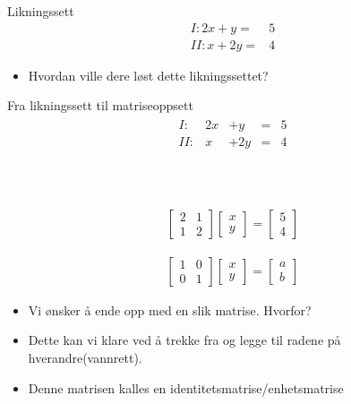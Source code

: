 \documentclass[norsk]{beamer}
\newcommand\Fontvi{\fontsize{20}{7.2}\selectfont}
\newcommand\Fontvitwo{\fontsize{10}{7.2}\selectfont}
\begin{document}
\Fontvi
\begin{frame}{Likningssett}
\begin{align*}
I: 2x + y =& 5\\
II: x + 2y =& 4
\end{align*}

\Fontvitwo
\begin{itemize}
	\item Hvordan ville dere løst dette likningssettet?
\end{itemize}
\end{frame}
\begin{frame}{Fra likningssett til matriseoppsett}
\Fontvi
\centering
\begin{align*}
\begin{matrix}
I:& 2x& + y& =& 5\\
II:& x& + 2y& =& 4
\end{matrix}
\end{align*}
\\
\Downarrow\\
\\
\begin{align*}
\begin{bmatrix}
	2 & 1 \\
	1 & 2
\end{bmatrix}
\begin{bmatrix}
	x \\
	y
\end{bmatrix}
=
\begin{bmatrix}
	5 \\
	4
\end{bmatrix}
\end{align*}
\end{frame}
\begin{frame}
\Fontvi
\begin{align*}
\begin{bmatrix}
	1 & 0 \\
	0 & 1
\end{bmatrix}
\begin{bmatrix}
	x \\
	y
\end{bmatrix}
=
\begin{bmatrix}
	a \\
	b
\end{bmatrix}
\end{align*}
\Fontvitwo
\begin{itemize}
	\item Vi ønsker å ende opp med en slik matrise. Hvorfor?
	\item Dette kan vi klare ved å trekke fra og legge til radene på
		hverandre(vannrett).
	\item Denne matrisen kalles en identitetsmatrise/enhetsmatrise
\end{itemize}
\end{frame}
\end{document}
